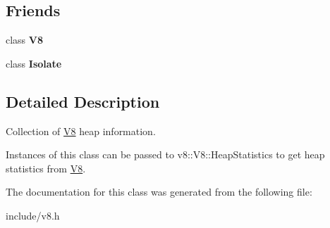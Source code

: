 \subsection*{Friends}
\begin{DoxyCompactItemize}
\item 
class {\bfseries V8}\hypertarget{classv8_1_1_heap_statistics_a51a1fbf409294cf02a99a020ac94a763}{}\label{classv8_1_1_heap_statistics_a51a1fbf409294cf02a99a020ac94a763}

\item 
class {\bfseries Isolate}\hypertarget{classv8_1_1_heap_statistics_aba4f0964bdacf2bbf62cf876e5d28d0a}{}\label{classv8_1_1_heap_statistics_aba4f0964bdacf2bbf62cf876e5d28d0a}

\end{DoxyCompactItemize}


\subsection{Detailed Description}
Collection of \hyperlink{classv8_1_1_v8}{V8} heap information.

Instances of this class can be passed to v8\+::\+V8\+::\+Heap\+Statistics to get heap statistics from \hyperlink{classv8_1_1_v8}{V8}. 

The documentation for this class was generated from the following file\+:\begin{DoxyCompactItemize}
\item 
include/v8.\+h\end{DoxyCompactItemize}
